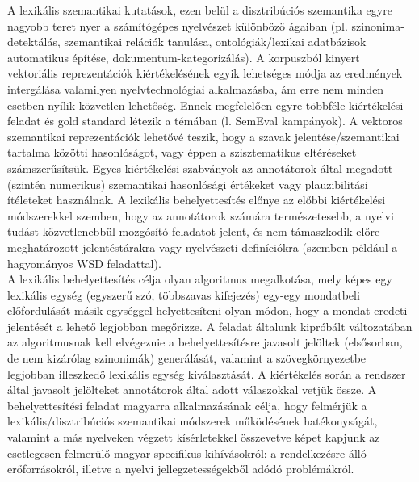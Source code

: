 \documentclass{llncs}
\begin{document}
A lexik\'{a}lis szemantikai kutat\'{a}sok, ezen bel\"{u}l a disztrib\'{u}ci\'{o}s szemantika egyre nagyobb teret nyer a sz\'{a}m\'{i}t\'{o}g\'{e}pes nyelv\'{e}szet k\"{u}l\"{o}nb\"{o}z\"{o} \'{a}gaiban (pl. szinonima-detekt\'{a}l\'{a}s, szemantikai rel\'{a}ci\'{o}k tanul\'{a}sa, ontol\'{o}gi\'{a}k/lexikai adatb\'{a}zisok automatikus \'{e}p\'{i}t\'{e}se, dokumentum-kategoriz\'{a}l\'{a}s). A korpuszb\'{o}l kinyert vektori\'{a}lis reprezent\'{a}ci\'{o}k ki\'{e}rt\'{e}kel\'{e}s\'{e}nek egyik lehets\'{e}ges m\'{o}dja az eredm\'{e}nyek interg\'{a}l\'{a}sa valamilyen nyelvtechnol\'{o}giai alkalmaz\'{a}sba, \'{a}m erre nem minden esetben ny\'{i}lik k\"{o}zvetlen lehet\H{o}s\'{e}g. Ennek megfelel\H{o}en egyre t\"{o}bbf\'{e}le ki\'{e}rt\'{e}kel\'{e}si feladat \'{e}s gold standard l\'{e}tezik a t\'{e}m\'{a}ban (l. SemEval kamp\'{a}nyok). A vektoros szemantikai reprezent\'{a}ci\'{o}k lehet\H{o}v\'{e} teszik, hogy a szavak jelent\'{e}se/szemantikai tartalma k\"{o}z\"{o}tti hasonl\'{o}s\'{a}got, vagy \'{e}ppen a szisztematikus elt\'{e}r\'{e}seket sz\'{a}mszer\H{u}s\'{i}ts\"{u}k. Egyes ki\'{e}rt\'{e}kel\'{e}si szabv\'{a}nyok az annot\'{a}torok \'{a}ltal megadott (szint\'{e}n numerikus) szemantikai hasonl\'{o}s\'{a}gi \'{e}rt\'{e}keket \cite{rubens65} vagy plauzibilit\'{a}si \'{i}t\'{e}leteket \cite{pado07} haszn\'{a}lnak. A lexik\'{a}lis behelyettes\'{i}t\'{e}s el\H{o}nye az el\H{o}bbi ki\'{e}rt\'{e}kel\'{e}si m\'{o}dszerekkel szemben, hogy az annot\'{a}torok sz\'{a}m\'{a}ra term\'{e}szetesebb, a nyelvi tud\'{a}st k\"{o}zvetlenebb\"{u}l mozg\'{o}s\'{i}t\'{o} feladatot jelent, \'{e}s nem t\'{a}maszkodik el\H{o}re meghat\'{a}rozott jelent\'{e}st\'{a}rakra vagy nyelv\'{e}szeti defin\'{i}ci\'{o}kra (szemben p\'{e}ld\'{a}ul a hagyom\'{a}nyos WSD feladattal).\\

A lexik\'{a}lis behelyettes\'{i}t\'{e}s \cite{mccarthynavigli10,fabre14} c\'{e}lja olyan algoritmus megalkot\'{a}sa, mely k\'{e}pes egy lexik\'{a}lis egys\'{e}g (egyszer\H{u} sz\'{o}, t\"{o}bbszavas kifejez\'{e}s) egy-egy mondatbeli el\H{o}fordul\'{a}s\'{a}t m\'{a}sik egys\'{e}ggel helyettes\'{i}teni olyan m\'{o}don, hogy a mondat eredeti jelent\'{e}s\'{e}t a lehet\H{o} legjobban meg\H{o}rizze. A feladat \'{a}ltalunk kipr\'{o}b\'{a}lt v\'{a}ltozat\'{a}ban az algoritmusnak kell elv\'{e}geznie a behelyettes\'{i}t\'{e}sre javasolt jel\"{o}ltek (els\H{o}sorban, de nem kiz\'{a}r\'{o}lag szinonim\'{a}k) gener\'{a}l\'{a}s\'{a}t, valamint a sz\"{o}vegk\"{o}rnyezetbe legjobban illeszked\H{o} lexik\'{a}lis egys\'{e}g kiv\'{a}laszt\'{a}s\'{a}t. A ki\'{e}rt\'{e}kel\'{e}s sor\'{a}n a rendszer \'{a}ltal javasolt jel\"{o}lteket annot\'{a}torok \'{a}ltal adott v\'{a}laszokkal vetj\"{u}k \"{o}ssze. A behelyettes\'{i}t\'{e}si feladat magyarra alkalmaz\'{a}s\'{a}nak c\'{e}lja, hogy felm\'{e}rj\"{u}k a lexik\'{a}lis/disztrib\'{u}ci\'{o}s szemantikai m\'{o}dszerek m\H{u}k\"{o}d\'{e}s\'{e}nek hat\'{e}konys\'{a}g\'{a}t, valamint  a m\'{a}s nyelveken v\'{e}gzett k\'{i}s\'{e}rletekkel \"{o}sszevetve k\'{e}pet kapjunk az esetlegesen felmer\"{u}l\H{o} magyar-specifikus kih\'{i}v\'{a}sokr\'{o}l: a rendelkez\'{e}sre \'{a}ll\'{o} er\H{o}forr\'{a}sokr\'{o}l, illetve a nyelvi jellegzetess\'{e}gekb\H{o}l ad\'{o}d\'{o} probl\'{e}m\'{a}kr\'{o}l.\\
\end{document}
